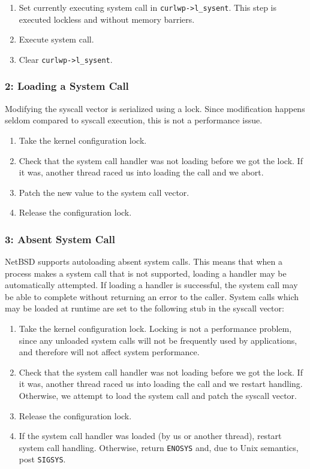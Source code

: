 \begin{enumerate}
\item	Set currently executing system call in \verb+curlwp->l_sysent+.
	This step is executed lockless and without memory barriers.
\item	Execute system call.
\item	Clear \verb+curlwp->l_sysent+.
\end{enumerate}

\subsubsection*{2: Loading a System Call}

Modifying the syscall vector is serialized using a lock.
Since modification happens seldom compared to syscall execution,
this is not a performance issue.

\begin{enumerate}
\item	Take the kernel configuration lock.
\item   Check that the system call handler was not loading before
	we got the lock.  If it was, another thread raced us into loading
	the call and we abort.
\item	Patch the new value to the system call vector.
\item   Release the configuration lock.
\end{enumerate}

\subsubsection*{3: Absent System Call}

NetBSD supports autoloading absent system calls.  This means that when
a process makes a system call that is not supported, loading a handler
may be automatically attempted.  If loading a handler is successful,
the system call may be able to complete without returning an error to
the caller.  System calls which may be loaded at runtime are set to the
following stub in the syscall vector:

\begin{enumerate}
\item	Take the kernel configuration lock.  Locking is not a performance
	problem, since any unloaded system calls will not be frequently
	used by applications, and therefore will not affect system
	performance.
\item   Check that the system call handler was not loading before
	we got the lock.  If it was, another thread raced us into loading
	the call and we restart handling.  Otherwise, we attempt to load
	the system call and patch the syscall vector.
\item	Release the configuration lock.
\item	If the system call handler was loaded (by us or another thread),
	restart system
	call handling.  Otherwise, return \texttt{ENOSYS} and, due to
	Unix semantics, post \texttt{SIGSYS}.
\end{enumerate}

